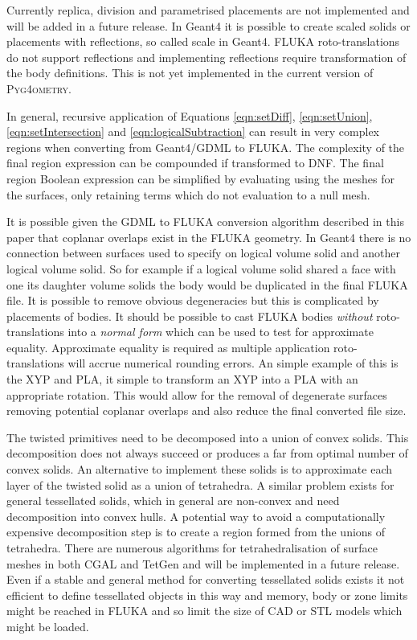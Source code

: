 \documentclass[final,5p,times,twocolumn]{elsarticle}
\newcommand{\PYGEOMETRY}{\textsc{Pyg4ometry}}
\begin{document}
Currently replica, division and parametrised placements are not implemented 
and will be added in a future release. In Geant4 it is possible to create scaled 
solids or placements with reflections, so called scale in Geant4. FLUKA 
roto-translations do not support reflections and implementing reflections 
require transformation of the body definitions. This is not yet implemented 
in the current version of \PYGEOMETRY{}. 

In general, recursive application of Equations \ref{eqn:setDiff},
\ref{eqn:setUnion}, \ref{eqn:setIntersection} and \ref{eqn:logicalSubtraction} 
can result in very complex regions when converting from Geant4/GDML to 
FLUKA. The complexity of the final region expression can be compounded 
if transformed to DNF. The final region Boolean expression can be simplified by 
evaluating using the meshes for the surfaces, only retaining terms which 
do not evaluation to a null mesh.

It is possible given the GDML to FLUKA conversion algorithm described 
in this paper that coplanar overlaps exist in the FLUKA geometry.  In 
Geant4 there is no connection between surfaces used to specify on 
logical volume solid and another logical volume solid. So for example 
if a logical volume solid shared a face with one its daughter volume 
solids the body would be duplicated in the final FLUKA file. It 
is possible to remove obvious degeneracies but this is complicated by 
placements of bodies. It should be possible to cast FLUKA bodies 
{\em without} roto-translations into a {\em normal form} which can be used 
to test for approximate equality. Approximate equality is required as 
multiple application roto-translations will accrue numerical rounding errors.
An simple example of this is the XYP and PLA, it simple to transform an 
XYP into a PLA with an appropriate rotation. This would allow for the removal 
of degenerate surfaces removing potential coplanar overlaps and also reduce 
the final converted file size.

The twisted primitives need to be decomposed 
into a union of convex solids. This decomposition does not always 
succeed or produces a far from optimal number of convex solids. 
An alternative to implement these solids is to approximate each 
layer of the twisted solid as a union of tetrahedra. A similar problem 
exists for general tessellated solids, which in general
are non-convex and need decomposition into convex hulls. A potential 
way to avoid a computationally expensive decomposition step is to 
create a region formed from the unions of tetrahedra. There are numerous 
algorithms for tetrahedralisation of surface meshes in both CGAL and TetGen 
and will be implemented in a future release. Even if a stable and general 
method for converting tessellated solids exists it not efficient to define 
tessellated objects in this way and memory, body or zone limits might
be reached in FLUKA and so limit the size of CAD or STL models which 
might be loaded.
\end{document}
